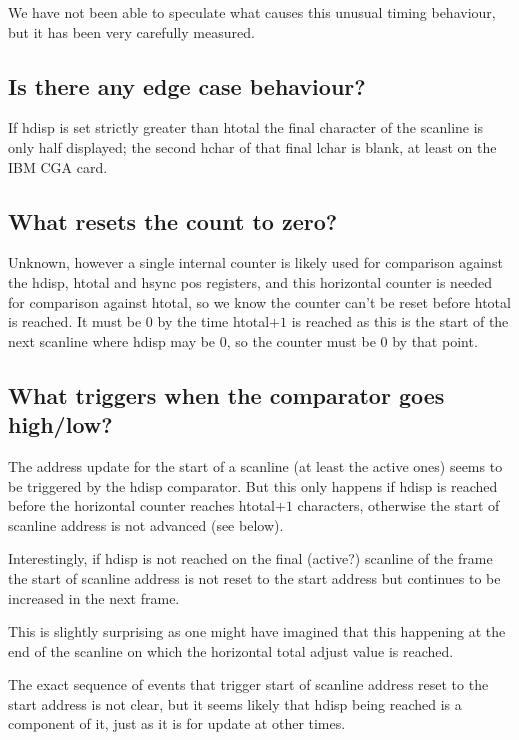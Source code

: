 \documentclass[a4paper,10pt]{amsart}
\begin{document}
We have not been able to speculate what causes this unusual timing behaviour,
but it has been very carefully measured.

\subsection{Is there any edge case behaviour?}

If hdisp is set strictly greater than htotal the final character of the
scanline is only half displayed; the second hchar of that final lchar is blank,
at least on the IBM CGA card.

\subsection{What resets the count to zero?}

Unknown, however a single internal counter is likely used for comparison
against the hdisp, htotal and hsync pos registers, and this horizontal counter
is needed for comparison against htotal, so we know the counter can't be reset
before htotal is reached. It must be 0 by the time htotal$+1$ is reached as
this is the start of the next scanline where hdisp may be $0$, so the counter
must be $0$ by that point.

\subsection{What triggers when the comparator goes high/low?}

The address update for the start of a scanline (at least the active ones) seems
to be triggered by the hdisp comparator. But this only happens if hdisp
is reached before the horizontal counter reaches htotal$+1$ characters,
otherwise the start of scanline address is not advanced (see below).

Interestingly, if hdisp is not reached on the final (active?) scanline of the
frame the start of scanline address is not reset to the start address but
continues to be increased in the next frame.

This is slightly surprising as one might have imagined that this happening
at the end of the scanline on which the horizontal total adjust value is
reached.

The exact sequence of events that trigger start of scanline address reset to
the start address is not clear, but it seems likely that hdisp being reached is
a component of it, just as it is for update at other times.
\end{document}
